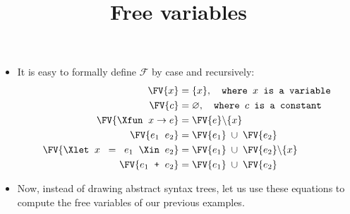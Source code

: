 \documentclass[wide]{slides}
\begin{document}
\begin{slide}
  \title{Free variables}

  \begin{itemize}

    \item It is easy to formally define \(\mathcal{F}\) by case and
      recursively:
      \begin{align*}
        \FV{x} &= \{x\}, \quad\texttt{where $x$ is a
          variable}\\
        \FV{c} &= \varnothing, \quad\texttt{where $c$ is a
          constant}\\
        \FV{\Xfun \;\; x \rightarrow e} &=
          \FV{e} \backslash \{x\}\\
          \FV{e_1 \;\; e_2} &= \FV{e_1} \;\cup\; \FV{e_2}\\
          \FV{\Xlet \;\; x \;\; = \;\; e_1 \;\; \Xin \;\; e_2} &=
          \FV{e_1} \;\cup\; \FV{e_2} \backslash \{x\}\\
          \FV{e_1 \;\; \texttt{+} \;\; e_2} &= \FV{e_1} \;\cup\; \FV{e_2}
      \end{align*}

    \item Now, instead of drawing abstract syntax trees, let us use
      these equations to compute the free variables of our previous
      examples.

  \end{itemize}

\end{slide}
\end{document}
